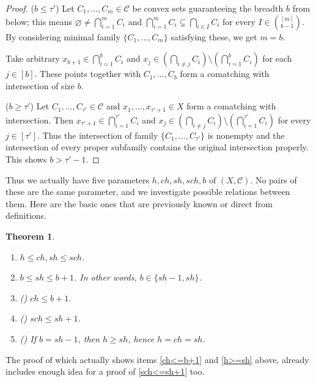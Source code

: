 \documentclass[11pt]{article}
\newtheorem{thm}{Theorem}[section]%
\theoremstyle{definition}
\newcommand{\C}{\mathcal{C}}
\begin{document}
\begin{proof}
    ($b \leq \tau'$)
    Let $C_1, \ldots, C_m \in \C$ be convex sets guaranteeing the breadth $b$ from below; this means $\varnothing \neq \bigcap_{i=1}^m C_i$ and $\bigcap_{i=1}^m C_i \subsetneq \bigcap_{i \in I} C_i$ for every $I \in \binom{[m] }{b-1}$.
    By considering minimal family $\{C_1, \ldots, C_m\}$ satisfying these, we get $m = b$.

    Take arbitrary $x_{b+1} \in \bigcap_{i=1}^b C_i$ and $x_j \in (\bigcap_{i \neq j} C_i) \setminus (\bigcap_{i=1}^b C_i)$ for each $j \in [b]$.
    These points together with $C_1, \ldots, C_b$ form a comatching with intersection of size $b$.

    ($b \geq \tau'$)
    Let $C_1, \ldots, C_{\tau'} \in \C$ and $x_1, \ldots, x_{\tau'+1} \in X$ form a comatching with intersection.
    Then $x_{\tau'+1} \in \bigcap_{i=1}^{\tau'}C_i$ and $x_j \in (\bigcap_{i \neq j}C_i) \setminus (\bigcap_{i=1}^{\tau'}C_i)$ for every $j \in [\tau']$.
    Thus the intersection of family $\{C_1, \ldots, C_{\tau'}\}$ is nonempty and the intersection of every proper subfamily contains the original intersection properly.
    This shows $b > \tau' - 1$.
\end{proof}
Thus we actually have five parameters $h, ch, sh, sch, b$ of $(X, \C)$.
No pairs of these are the same parameter, and we investigate possible relations between them.
Here are the basic ones that are previously known or direct from definitions.
\begin{thm}\label{t:parameters}\phantom{}
    \begin{enumerate}
        \item $h \leq ch, sh \leq sch$.
        \item $b \leq sh \leq b+1$.
        In other words, $b \in \{sh-1, sh\}$.
        \item \label{ch<=b+1} (\cite{pohoata2025colorful}) $ch \leq b+1$.
        \item \label{sch<=sh+1} (\cite{pohoata2025colorful}) $sch \leq sh+1$.
        \item \label{h>=sh}  (\cite{pohoata2025colorful}) If $b = sh-1$, then $h \geq sh$, hence $h = ch = sh$.
    \end{enumerate}
\end{thm}
The proof of \cite[Theorem~1.3]{pohoata2025colorful} which actually shows items \ref{ch<=b+1} and \ref{h>=sh} above, already includes enough idea for a proof of \ref{sch<=sh+1} too.
\end{document}
